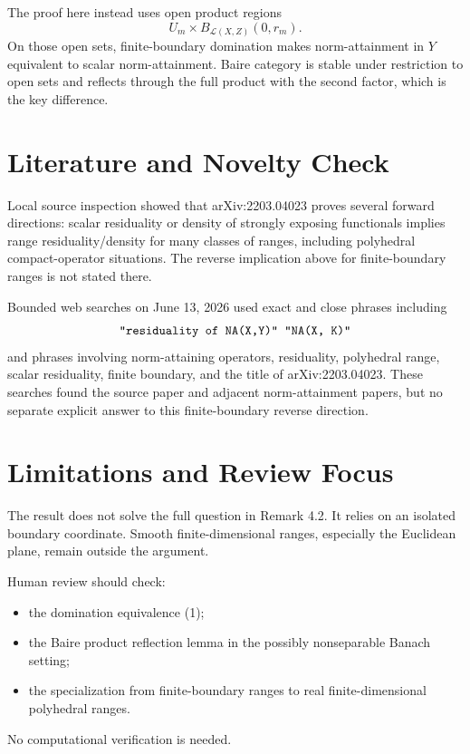 \documentclass[11pt]{article}
\newcommand{\calL}{\mathcal L}
\begin{document}
The proof here instead uses open product regions
\[
  U_m\times B_{\calL(X,Z)}(0,r_m).
\]
On those open sets, finite-boundary domination makes norm-attainment in
\(Y\) equivalent to scalar norm-attainment.  Baire category is stable under
restriction to open sets and reflects through the full product with the
second factor, which is the key difference.

\section*{Literature and Novelty Check}

Local source inspection showed that arXiv:2203.04023 proves several forward
directions: scalar residuality or density of strongly exposing functionals
implies range residuality/density for many classes of ranges, including
polyhedral compact-operator situations.  The reverse implication above for
finite-boundary ranges is not stated there.

Bounded web searches on June 13, 2026 used exact and close phrases including
\[
\text{\ttfamily "residuality of NA(X,Y)" "NA(X, K)"}
\]
and phrases involving norm-attaining operators, residuality, polyhedral
range, scalar residuality, finite boundary, and the title of arXiv:2203.04023.
These searches found the source paper and adjacent norm-attainment papers,
but no separate explicit answer to this finite-boundary reverse direction.

\section*{Limitations and Review Focus}

The result does not solve the full question in Remark 4.2.  It relies on an
isolated boundary coordinate.  Smooth finite-dimensional ranges, especially
the Euclidean plane, remain outside the argument.

Human review should check:
\begin{itemize}
\item the domination equivalence (1);
\item the Baire product reflection lemma in the possibly nonseparable Banach
  setting;
\item the specialization from finite-boundary ranges to real finite-dimensional
  polyhedral ranges.
\end{itemize}

No computational verification is needed.
\end{document}

